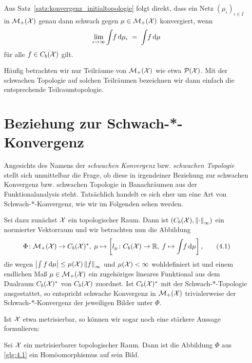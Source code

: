\documentclass[../thesis/thesis.tex]{subfiles}
\begin{document}
	\begin{Bemerkung}
		Aus Satz~\ref{satz:konvergenz_initialtopologie} folgt direkt, dass ein Netz $(\mu_\iota)_{\iota \in I}$ in $\mathcal{M}_{+}(\mathcal{X})$ genau dann schwach gegen $\mu \in \mathcal{M}_{+}(\mathcal{X})$
		konvergiert, wenn
		\[ \lim_{\iota \to \infty} \int_{} \, f \, \mathrm{d}\mu_\iota \; = \; \int_{} \, f \, \mathrm{d}\mu \]
		für alle $f \in C_b(\mathcal{X})$ gilt.
	\end{Bemerkung}

	Häufig betrachten wir nur Teilräume von $\mathcal{M}_{+}(\mathcal{X})$ wie etwa $\mathcal{P}(\mathcal{X})$. Mit der schwachen Topologie auf solchen Teilräumen bezeichnen wir 
	dann einfach die entsprechende Teilraumtopologie.

	\section{Beziehung zur Schwach-*-Konvergenz}
	\label{subsec:beziehung_schwach-stern-konvergenz}
	
	Angesichts des Namens der \emph{schwachen Konvergenz} bzw. \emph{schwachen Topologie} stellt sich unmittelbar die Frage, ob diese in irgendeiner Beziehung zur schwachen Konvergenz bzw. schwachen Topologie in Banachräumen aus der 
	Funktionalanalysis steht. Tatsächlich handelt es sich eher um eine Art von Schwach-$\ast$-Konvergenz, wie wir im Folgenden sehen werden. 
	
	Sei dazu zunächst $\mathcal{X}$ ein topologischer Raum. Dann ist $(C_b(\mathcal{X}), \left\lVert\cdot\right\rVert_\infty)$ ein normierter Vektorraum und wir betrachten nun die Abbildung
	\[\Phi \colon \mathcal{M}_{+}(\mathcal{X}) \to C_b(\mathcal{X})^\ast, \; \mu \mapsto \left[l_\mu \colon C_b(\mathcal{X}) \to \mathbb{R}, \; f \mapsto \int_{} \, f \, \mathrm{d}\mu \right]  \text{,} \label{glg:4.1} \tag{4.1}\]
	die wegen $\left| \int_{} \, f \, \mathrm{d}\mu \right| \leq \mu(\mathcal{X}) \left\lVert f\right\rVert_\infty$ und $\mu(\mathcal{X}) < \infty$ wohldefiniert ist 
	und einem endlichen Maß $\mu \in \mathcal{M}_{+}(\mathcal{X})$ ein zugehöriges lineares Funktional aus dem Dualraum $C_b(\mathcal{X})^\ast$ von $C_b(\mathcal{X})$ zuordnet. 
	Ist $C_b(\mathcal{X})^\ast$ mit der 
	Schwach-$\ast$-Topologie ausgestattet, so entspricht schwache Konvergenz in $\mathcal{M}_{+}(\mathcal{X})$ trivialerweise der 
	Schwach-$\ast$-Konvergenz der jeweiligen Bilder unter $\Phi$.
	
	Ist $\mathcal{X}$ etwa metrisierbar, so können wir sogar noch eine stärkere Aussage formulieren:
	
	\begin{Hilfssatz}
		Sei $\mathcal{X}$ ein metrisierbarer topologischer Raum. Dann ist die Abbildung $\Phi$ aus \eqref{glg:4.1} ein Homöomorphismus auf sein Bild.
	\end{Hilfssatz}
\end{document}
